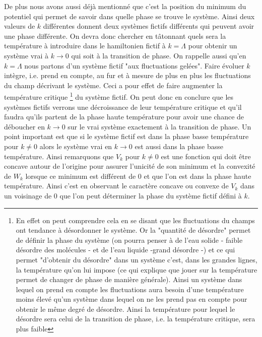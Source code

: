 \documentclass[10pt]{article}
\begin{document}
\begin{multicols}{2}
De plus nous avons aussi déjà mentionné que c'est la position du minimum du potentiel qui permet de savoir dans quelle phase se trouve le système. Ainsi deux valeurs de $k$ différentes donnent deux systèmes fictifs différents qui peuvent avoir une phase différente. On devra donc chercher en tâtonnant quels sera la température à introduire dans le hamiltonien fictif à $k=\Lambda$ pour obtenir un système vrai à $k \to 0$ qui soit à la transition de phase. On rappelle aussi qu'en $k=\Lambda$ nous partons d'un système fictif "aux fluctuations gelées". Faire évoluer $k$ intègre, i.e. prend en compte, au fur et à mesure de plus en plus les fluctuations du champ décrivant le système. Ceci a pour effet de faire augmenter la température critique
\footnote{En effet on peut comprendre cela en se disant que les fluctuations du champs ont tendance à désordonner le système. Or la "quantité de désordre" permet de définir la phase du système (on pourra penser à de l'eau solide - faible désordre des molécules - et de l'eau liquide -grand désordre -) et ce qui permet "d'obtenir du désordre" dans un système c'est, dans les grandes lignes, la température qu'on lui impose (ce qui explique que jouer sur la température permet de changer de phase de manière générale). Ainsi un système dans lequel on prend en compte les fluctuations aura besoin d'une température moins élevé qu'un système dans lequel on ne les prend pas en compte pour obtenir le même degré de désordre. Ainsi la température pour lequel le désordre sera celui de la transition de phase, i.e. la température critique, sera plus faible} du système fictif. 
On peut donc en conclure que les systèmes fictifs verrons une décroissance de leur température critique et qu'il faudra qu'ils partent de la phase haute température pour avoir une chance de déboucher en $k\to 0$ sur le vrai système exactement à la transition de phase. Un point important est que si le système fictif est dans la phase basse température pour $k\neq 0$ alors le système vrai en $k \to 0$ est aussi dans la phase basse température. Ainsi remarquons que $V_k$ pour $k \neq 0$ est une fonction qui doit être concave autour de l'origine pour assurer l'unicité de son minimum et la convexité de $W_k$ lorsque ce minimum est différent de $0$ et que l'on est dans la phase haute température. Ainsi c'est en observant le caractère concave ou convexe de $V_k$ dans un voisinage de $0$ que l'on peut déterminer la phase du système fictif défini à $k$. 


\vspace*{11pt}

\end{multicols}
\end{document}
